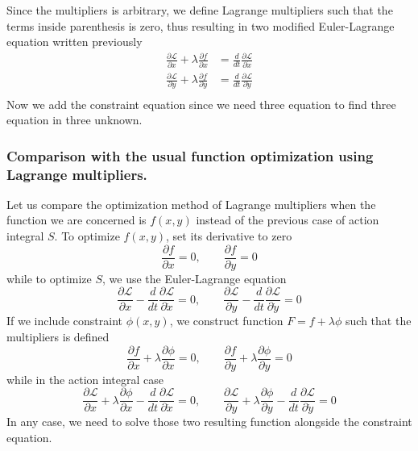 \documentclass[../../../main.tex]{subfiles}
\begin{document}
Since the multipliers is arbitrary, we define Lagrange multipliers such that the terms inside parenthesis is zero, thus resulting in two modified Euler-Lagrange equation written previously
\begin{align*}
	\frac{\partial \mathcal{L}}{\partial x}+\lambda\frac{\partial f}{\partial x} & =\frac{d}{dt}\frac{\partial \mathcal{L}}{\partial \dot{x}} \\
	\frac{\partial \mathcal{L}}{\partial y}+\lambda\frac{\partial f}{\partial y} & =\frac{d}{dt}\frac{\partial \mathcal{L}}{\partial \dot{y}} \\
\end{align*}
Now we add the constraint equation since we need three equation to find three equation in three unknown.

\subsubsection*{Comparison with the usual function optimization using Lagrange multipliers.}
Let us compare the optimization method of Lagrange multipliers when the function we are concerned is $f(x,y)$ instead of the previous case of action integral $S$.
To optimize $f(x,y)$, set its derivative to zero
\begin{equation*}
	\frac{\partial f}{\partial x}=0,\qquad\frac{\partial f}{\partial y}=0
\end{equation*}
while to optimize $S$, we use the Euler-Lagrange equation
\begin{equation*}
	\frac{\partial \mathcal{L}}{\partial x}-\frac{d}{dt}\frac{\partial\mathcal{L}}{\partial\dot{x}}=0,\qquad\frac{\partial\mathcal{L}}{\partial y}-\frac{d}{dt}\frac{\partial \mathcal{L}}{\partial \dot{y}}=0
\end{equation*}
If we include constraint $\phi(x,y)$, we construct function $F=f+\lambda\phi$ such that the multipliers is defined
\begin{equation*}
	\frac{\partial f}{\partial x}+\lambda\frac{\partial \phi}{\partial x}=0,\qquad\frac{\partial f}{\partial y}+\lambda\frac{\partial \phi}{\partial y}=0
\end{equation*}
while in the action integral case
\begin{equation*}
	\frac{\partial \mathcal{L}}{\partial x}+\lambda\frac{\partial\phi}{\partial x}-\frac{d}{dt}\frac{\partial\mathcal{L}}{\partial\dot{x}}=0,
	\qquad\frac{\partial\mathcal{L}}{\partial y}+\lambda\frac{\partial\phi}{\partial y}-\frac{d}{dt}\frac{\partial \mathcal{L}}{\partial \dot{y}}=0
\end{equation*}
In any case, we need to solve those two resulting function alongside the constraint equation.
\end{document}
